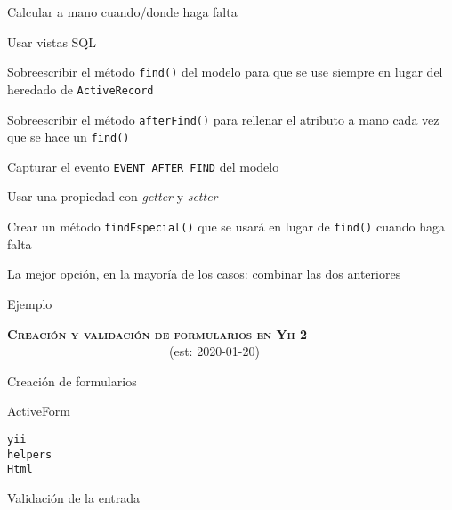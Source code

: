 \begin{longenum}
\begin{longenum}
\begin{longenum}
\begin{longenum}
                \begin{longenum}
                    \item Calcular a mano cuando/donde haga falta
                    \item Usar vistas SQL
                    \item Sobreescribir el método \texttt{find()} del modelo para que se use siempre en lugar del heredado de \texttt{ActiveRecord}
                    \item Sobreescribir el método \texttt{afterFind()} para rellenar el atributo a mano cada vez que se hace un \texttt{find()}
                    \item Capturar el evento \texttt{EVENT\_AFTER\_FIND} del modelo
                    \item Usar una propiedad con \textit{getter} y \textit{setter}
                    \item Crear un método \texttt{findEspecial()} que se usará en lugar de \texttt{find()} cuando haga falta
                    \item La mejor opción, en la mayoría de los casos: combinar las dos anteriores
                    \begin{longenum}
                        \item Ejemplo
                    \end{longenum}
                \end{longenum}
            \end{longenum}
        \end{longenum}
    \end{longenum}
    \item \textbf{\textsc{Creación y validación de formularios en Yii 2}} \ \ \ \ \ \ \ \ \ \ \ \ \ \ \ \ \ \ \ \ \ \ \ \ \ \ (est: \mbox{2020-01-20})
    \begin{longenum}
        \item Creación de formularios
        \begin{longenum}
            \item ActiveForm
            \item \texttt{yii\\helpers\\Html}
        \end{longenum}
        \item Validación de la entrada

\end{longenum}
\end{longenum}
